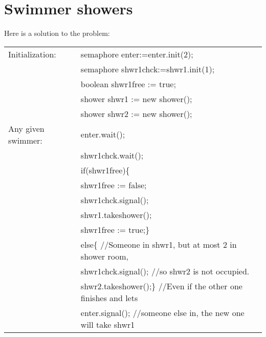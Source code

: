 \documentclass[10pt,a4paper]{article}
\begin{document}
\section{Swimmer showers}

Here is a solution to the problem:

\begin{tabular}{|ll|}\hline
Initialization:     &semaphore enter:=enter.init(2);\\
                    &semaphore shwr1chck:=shwr1.init(1);\\
                    &boolean shwr1free := true;\\
                    &shower shwr1 := new shower();\\
                    &shower shwr2 := new shower();\\ \hline
Any given swimmer:  &enter.wait();\\
                    &shwr1chck.wait();\\
                    &if(shwr1free)\{\\
                    &\quad shwr1free := false;  \\
                    &\quad shwr1chck.signal();\\
                    &\quad shwr1.takeshower();\\
                    &\quad shwr1free := true;\}\\
                    &else\{ {\color{blue} //Someone in shwr1, but at most 2 in shower room,}\\
                    &\quad shwr1chck.signal(); {\color{blue} //so shwr2 is not occupied.}\\
                    &\quad shwr2.takeshower();\} {\color{blue} //Even if the other one finishes and lets}\\
                    &enter.signal(); {\color{blue} //someone else in, the new one will take shwr1}\\ \hline
\end{tabular}
\end{document}
